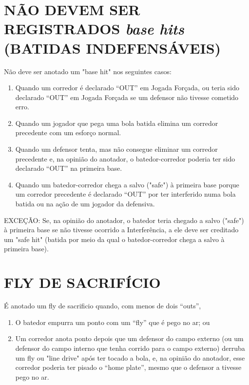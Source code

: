 \section[Bat Indefens\'aveis]{NÃO DEVEM SER REGISTRADOS \textit{base hits} (BATIDAS INDEFENSÁVEIS) }
\begin{multicols}{2}
	Não deve ser anotado um "base hit" nos seguintes casos:

	\begin{enumerate}[label=\alph*)]
		\item Quando um corredor é declarado “OUT” em Jogada Forçada, ou teria sido declarado
		“OUT” em Jogada Forçada se um defensor não tivesse cometido erro.

		\item  Quando um jogador que pega uma bola batida elimina um corredor precedente com
		um esforço normal.

		\item  Quando um defensor tenta, mas não consegue eliminar um corredor precedente e,
		na opinião do anotador, o batedor-corredor poderia ter sido declarado “OUT” na
		primeira base.

		\item  Quando um batedor-corredor chega a salvo ("safe") à primeira base porque um
		corredor precedente é declarado “OUT” por ter interferido numa bola batida ou na
		ação de um jogador da defensiva.
	\end{enumerate}
	EXCEÇÃO: Se, na opinião do anotador, o batedor teria chegado a salvo ("safe") à
	primeira base se não tivesse ocorrido a Interferência, a ele deve ser creditado um "safe
	hit" (batida por meio da qual o batedor-corredor chega a salvo à primeira base).
\end{multicols}

\section{FLY DE SACRIFÍCIO }
\begin{multicols}{2}
	É anotado um \gls{fly de sacrificio} quando, com menos de dois “outs”,

	\begin{enumerate}[label=\alph*)]
		\item O batedor empurra um ponto com um “fly” que é pego no ar; ou

		\item  Um corredor anota ponto depois que um defensor do campo externo (ou um
		defensor do campo interno que tenha corrido para o campo externo) derruba um \gls{fly}
		ou "line drive" após ter tocado a bola, e, na opinião do anotador, esse corredor
		poderia ter pisado o “home plate”, mesmo que o defensor a tivesse pego no ar.
	\end{enumerate}
\end{multicols}
